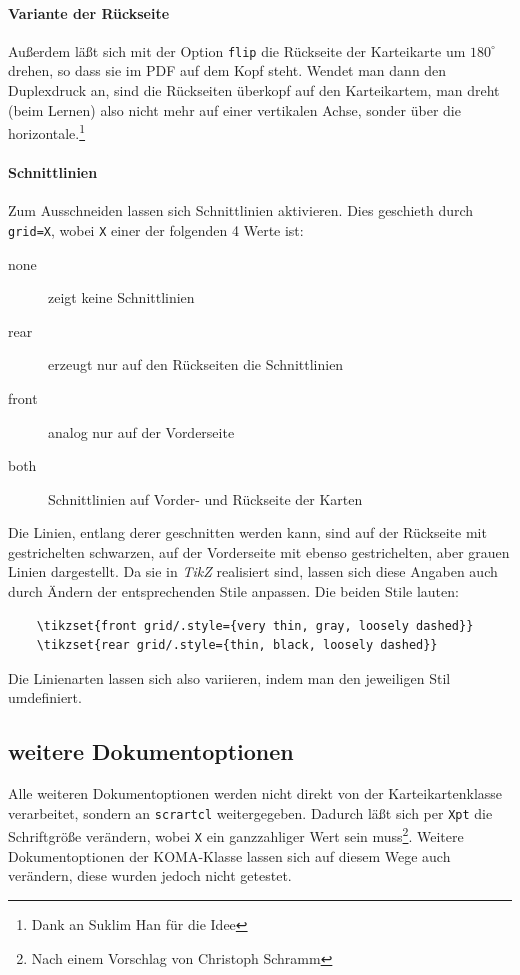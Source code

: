 \documentclass[a4paper,DIV=calc]{scrartcl}
\newcommand{\befehl}[1]{%
\marginpar{\footnotesize\textsf{#1}}%
}
\begin{document}
\paragraph{Variante der Rückseite} 
Außerdem läßt sich mit der Option \befehl{flip}\lstinline!flip! die Rückseite der Karteikarte um $180^{\circ}$ drehen, so dass sie im PDF auf dem Kopf steht. Wendet man dann den Duplexdruck an, sind die Rückseiten überkopf auf den Karteikartem, man dreht (beim Lernen) also nicht mehr auf einer vertikalen Achse, sonder über die horizontale.\footnote{Dank an Suklim Han für die Idee}

\paragraph{Schnittlinien}
Zum Ausschneiden lassen sich Schnittlinien aktivieren. Dies geschieth durch \befehl{grid=X} \lstinline!grid=X!, wobei \lstinline!X! einer der folgenden 4 Werte ist:
\begin{description}
	\item[none] zeigt keine Schnittlinien
	\item[rear] erzeugt nur auf den Rückseiten die Schnittlinien
	\item[front] analog nur auf der Vorderseite
	\item[both] Schnittlinien auf Vorder- und Rückseite der Karten	
\end{description}
Die Linien, entlang derer geschnitten werden kann, sind auf der Rückseite mit gestrichelten schwarzen, auf der Vorderseite mit ebenso gestrichelten, aber grauen Linien dargestellt. Da sie in \emph{TikZ} realisiert sind, lassen sich diese Angaben auch durch Ändern der entsprechenden Stile anpassen. Die beiden Stile lauten:
\begin{lstlisting}
	\tikzset{front grid/.style={very thin, gray, loosely dashed}}
	\tikzset{rear grid/.style={thin, black, loosely dashed}}
\end{lstlisting}
Die Linienarten lassen sich also variieren, indem man den jeweiligen Stil umdefiniert.
\subsection{weitere Dokumentoptionen}
Alle weiteren Dokumentoptionen werden nicht direkt von der Karteikartenklasse verarbeitet, sondern an \lstinline!scrartcl! weitergegeben. Dadurch läßt sich per \befehl{Xpt}\lstinline!Xpt! die Schriftgröße verändern, wobei \lstinline!X! ein ganzzahliger Wert sein muss\footnote{Nach einem Vorschlag von Christoph Schramm}. Weitere Dokumentoptionen der KOMA-Klasse lassen sich auf diesem Wege auch verändern, diese wurden jedoch nicht getestet.
\end{document}

